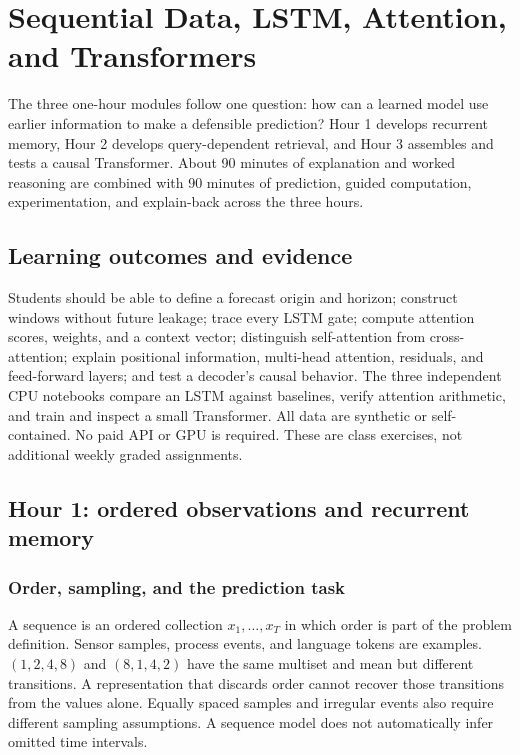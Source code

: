 \chapter{Sequential Data, LSTM, Attention, and Transformers}
\label{chap:sequences-attention}

The three one-hour modules follow one question: how can a learned model use
earlier information to make a defensible prediction? Hour 1 develops recurrent
memory, Hour 2 develops query-dependent retrieval, and Hour 3 assembles and
tests a causal Transformer. About 90 minutes of explanation and worked
reasoning are combined with 90 minutes of prediction, guided computation,
experimentation, and explain-back across the three hours.

\section{Learning outcomes and evidence}
Students should be able to define a forecast origin and horizon; construct
windows without future leakage; trace every LSTM gate; compute attention
scores, weights, and a context vector; distinguish self-attention from
cross-attention; explain positional information, multi-head attention,
residuals, and feed-forward layers; and test a decoder's causal behavior.
The three independent CPU notebooks compare an LSTM against baselines,
verify attention arithmetic, and train and inspect a small Transformer.
All data are synthetic or self-contained. No paid API or GPU is required.
These are class exercises, not additional weekly graded assignments.

\section{Hour 1: ordered observations and recurrent memory}
\subsection{Order, sampling, and the prediction task}
A sequence is an ordered collection $x_1,\ldots,x_T$ in which order is part
of the problem definition. Sensor samples, process events, and language
tokens are examples. $(1,2,4,8)$ and $(8,1,4,2)$ have the same multiset and
mean but different transitions. A representation that discards order
cannot recover those transitions from the values alone. Equally spaced
samples and irregular events also require different sampling assumptions.
A sequence model does not automatically infer omitted time intervals.


